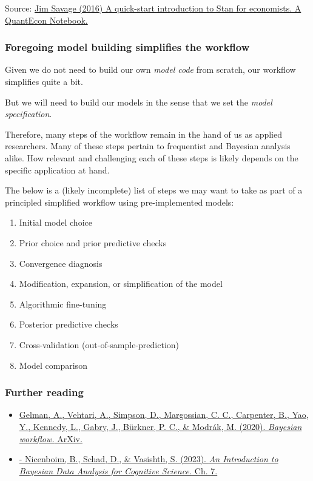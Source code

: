 \documentclass[
  11pt,
]{article}
\providecommand{\tightlist}{%
  \setlength{\itemsep}{0pt}\setlength{\parskip}{0pt}}
\begin{document}
Source: \href{http://nbviewer.jupyter.org/github/QuantEcon/QuantEcon.notebooks/blob/master/IntroToStan_basics_workflow.ipynb}{Jim Savage (2016) A quick-start introduction to Stan for economists. A QuantEcon Notebook.}

\hypertarget{foregoing-model-building-simplifies-the-workflow}{%
\subsubsection{Foregoing model building simplifies the workflow}\label{foregoing-model-building-simplifies-the-workflow}}

Given we do not need to build our own \emph{model code} from scratch, our workflow simplifies quite a bit.

But we will need to build our models in the sense that we set the \emph{model specification}.

Therefore, many steps of the workflow remain in the hand of us as applied researchers. Many of these steps pertain to frequentist and Bayesian analysis alike. How relevant and challenging each of these steps is likely depends on the specific application at hand.

The below is a (likely incomplete) list of steps we may want to take as part of a principled simplified workflow using pre-implemented models:

\begin{enumerate}
\def\labelenumi{\arabic{enumi}.}
\tightlist
\item
  Initial model choice
\item
  Prior choice and prior predictive checks
\item
  Convergence diagnosis
\item
  Modification, expansion, or simplification of the model
\item
  Algorithmic fine-tuning
\item
  Posterior predictive checks
\item
  Cross-validation (out-of-sample-prediction)
\item
  Model comparison
\end{enumerate}

\hypertarget{further-reading}{%
\subsubsection{Further reading}\label{further-reading}}

\begin{itemize}
\tightlist
\item
  \href{https://arxiv.org/abs/2011.01808}{Gelman, A., Vehtari, A., Simpson, D., Margossian, C. C., Carpenter, B., Yao, Y., Kennedy, L., Gabry, J., Bürkner, P. C., \& Modrák, M. (2020). \emph{Bayesian workflow.} ArXiv.}
\item
  \href{https://vasishth.github.io/bayescogsci/book/ch-workflow.html}{- Nicenboim, B., Schad, D., \& Vasishth, S. (2023). \emph{An Introduction to Bayesian Data Analysis for Cognitive Science.} Ch. 7.}
\end{itemize}
\end{document}
